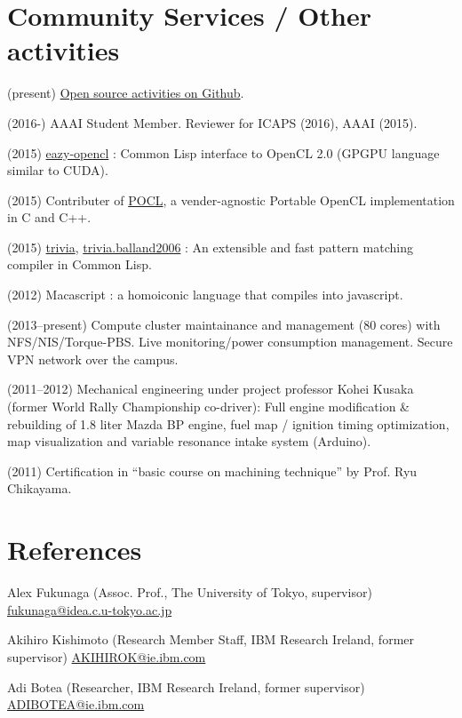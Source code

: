\documentclass[letterpaper,11pt]{article}
\begin{document}
\section{Community Services / Other activities}

(present) \href{https://github.com/guicho271828}{Open source activities on Github}.

(2016-) AAAI Student Member. Reviewer for ICAPS (2016), AAAI (2015).

(2015) \href{https://github.com/guicho271828/eazy-opencl}{eazy-opencl}
: Common Lisp interface to OpenCL 2.0 (GPGPU language similar to CUDA).

(2015) Contributer of \href{https://github.com/pocl/pocl}{POCL},
a vender-agnostic Portable OpenCL implementation in C and C++.

(2015) \href{https://github.com/guicho271828/trivia}{trivia},
\href{https://github.com/guicho271828/trivia.balland2006}{trivia.balland2006}
: An extensible and fast pattern matching compiler in Common Lisp.

(2012) Macascript : a homoiconic language that compiles into javascript.

(2013--present)
 Compute cluster maintainance and management (80 cores) with NFS/NIS/Torque-PBS.
 Live monitoring/power consumption management.
 Secure VPN network over the campus.

(2011--2012) Mechanical engineering under project professor Kohei Kusaka (former World Rally
 Championship co-driver):
 Full engine modification \& rebuilding of 1.8 liter Mazda BP engine,
 fuel map / ignition timing optimization, map visualization and
 variable resonance intake system (Arduino).

(2011) Certification in ``basic course on machining technique'' by Prof. Ryu Chikayama.


\section{References}

Alex Fukunaga (Assoc. Prof., The University of Tokyo, supervisor)
\url{fukunaga@idea.c.u-tokyo.ac.jp}

Akihiro Kishimoto (Research Member Staff, IBM Research Ireland, former supervisor)
\url{AKIHIROK@ie.ibm.com}


Adi Botea (Researcher, IBM Research Ireland, former supervisor)
\url{ADIBOTEA@ie.ibm.com}
\end{document}
